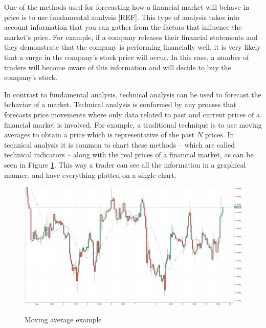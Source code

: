 One of the methods used for forecasting how a financial market will behave in
price is to use fundamental analysis [REF]. This type of analysis takes into
account information that you can gather from the factors that influence the
market's price. For example, if a company releases their financial statements
and they demonstrate that the company is performing financially well, it is very
likely that a surge in the company's stock price will occur. In this case, a
number of traders will become aware of this information and will decide to buy
the company's stock.

In contrast to fundamental analysis, technical analysis can be used to forecast
the behavior of a market. Technical analysis is conformed by any process that
forecasts price movements where only data related to past and current prices of
a financial market is involved. For example, a traditional technique is to use
moving averages to obtain a price which is representative of the past $N$
prices. In technical analysis it is common to chart these methods -- which are
called technical indicators -- along with the real prices of a financial market,
as can be seen in Figure \ref{figure:moving-average-example}. This way a trader
can see all the information in a graphical manner, and have everything plotted
on a single chart.


\begin{figure}
  \caption{Moving average example} \centering
  \includegraphics[width=1.0\textwidth]{img/moving-average.png}
  \label{figure:moving-average-example}
\end{figure}

